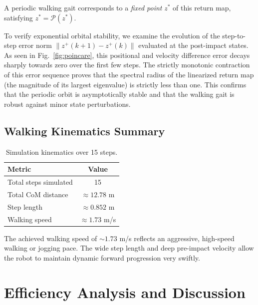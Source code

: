 \documentclass[conference]{IEEEtran}
\begin{document}
A periodic walking gait corresponds to a \emph{fixed point} $z^*$ of this return map, satisfying $z^* = \mathcal{P}(z^*)$.

To verify exponential orbital stability, we examine the evolution of the step-to-step error norm $\|z^+(k+1) - z^+(k)\|$ evaluated at the post-impact states. As seen in Fig.~\ref{fig:poincare}, this positional and velocity difference error decays sharply towards zero over the first few steps. The strictly monotonic contraction of this error sequence proves that the spectral radius of the linearized return map (the magnitude of its largest eigenvalue) is strictly less than one. This confirms that the periodic orbit is asymptotically stable and that the walking gait is robust against minor state perturbations.

\subsection{Walking Kinematics Summary}

\begin{table}[htbp]
    \centering
    \caption{Simulation kinematics over 15 steps.}
    \label{tab:sim_results}
    \begin{tabular}{lc}
        \toprule
        \textbf{Metric} & \textbf{Value} \\
        \midrule
        Total steps simulated          & 15 \\
        Total CoM distance             & $\approx 12.78$ m \\
        Step length                    & $\approx 0.852$ m \\
        Walking speed                  & $\approx 1.73$ m/s \\
        \bottomrule
    \end{tabular}
\end{table}

The achieved walking speed of $\sim 1.73$ m/s reflects an aggressive, high-speed walking or jogging pace. The wide step length and deep pre-impact velocity allow the robot to maintain dynamic forward progression very swiftly.

\section{Efficiency Analysis and Discussion} \label{sec:efficiency}
\end{document}
